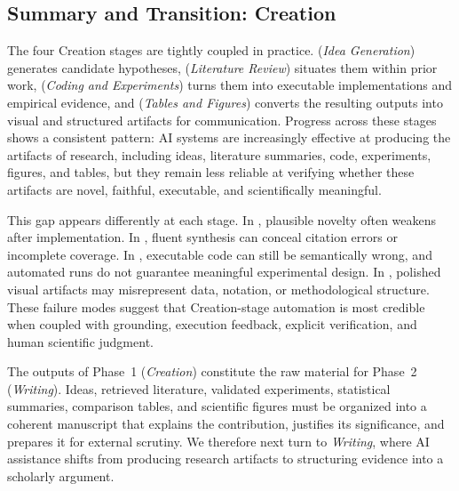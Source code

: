 \subsection{Summary and Transition: Creation}
\label{sec:creation_summary}

The four Creation stages are tightly coupled in practice. \Sone (\emph{Idea Generation}) generates candidate hypotheses, \Stwo (\emph{Literature Review}) situates them within prior work, \Sthree (\emph{Coding and Experiments}) turns them into executable implementations and empirical evidence, and \Sfour (\emph{Tables and Figures}) converts the resulting outputs into visual and structured artifacts for communication. Progress across these stages shows a consistent pattern: AI systems are increasingly effective at producing the artifacts of research, including ideas, literature summaries, code, experiments, figures, and tables, but they remain less reliable at verifying whether these artifacts are novel, faithful, executable, and scientifically meaningful.

This gap appears differently at each stage. In \Sone, plausible novelty often weakens after implementation. In \Stwo, fluent synthesis can conceal citation errors or incomplete coverage. In \Sthree, executable code can still be semantically wrong, and automated runs do not guarantee meaningful experimental design. In \Sfour, polished visual artifacts may misrepresent data, notation, or methodological structure. These failure modes suggest that Creation-stage automation is most credible when coupled with grounding, execution feedback, explicit verification, and human scientific judgment.

The outputs of Phase~1 (\emph{Creation}) constitute the raw material for Phase~2 (\emph{Writing}). Ideas, retrieved literature, validated experiments, statistical summaries, comparison tables, and scientific figures must be organized into a coherent manuscript that explains the contribution, justifies its significance, and prepares it for external scrutiny. We therefore next turn to \emph{Writing}, where AI assistance shifts from producing research artifacts to structuring evidence into a scholarly argument.